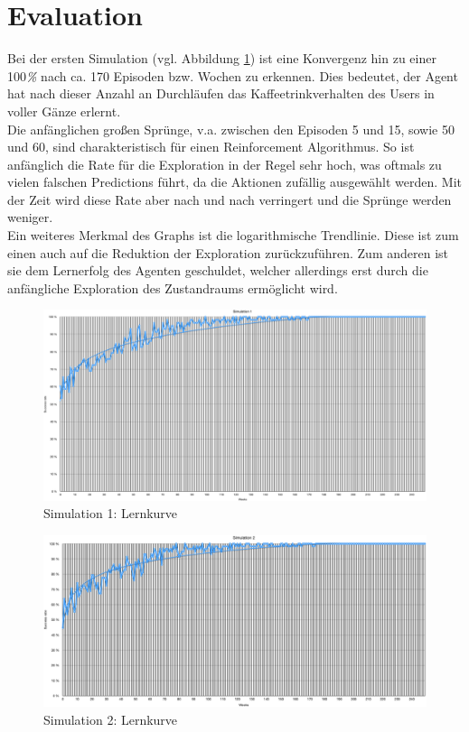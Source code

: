 \newpage
\section{Evaluation}

Bei der ersten Simulation (vgl. Abbildung \ref{img:sim1}) ist eine Konvergenz hin zu einer 100\textit{\%}  nach ca. 170 Episoden bzw. Wochen zu erkennen. Dies bedeutet, der Agent hat nach dieser Anzahl an Durchläufen das Kaffeetrinkverhalten des Users in voller Gänze erlernt. \\
Die anfänglichen großen Sprünge, v.a. zwischen den Episoden 5 und 15, sowie 50 und 60, sind charakteristisch für einen Reinforcement Algorithmus. So ist anfänglich die Rate für die Exploration in der Regel sehr hoch, was oftmals zu vielen falschen Predictions führt, da die Aktionen zufällig ausgewählt werden. Mit der Zeit wird diese Rate aber nach und nach verringert und die Sprünge werden weniger. \\
Ein weiteres Merkmal des Graphs ist die logarithmische Trendlinie. Diese ist zum einen auch auf die Reduktion der Exploration zurückzuführen. Zum anderen ist sie dem Lernerfolg des Agenten geschuldet, welcher allerdings erst durch die anfängliche Exploration des Zustandraums ermöglicht wird.


\begin{figure}[th!]
	\centering
	\includegraphics[width=.9\columnwidth]{./Abbildungen/Kapitel_04/sim1.png}
	\caption{Simulation 1: Lernkurve}
	\label{img:sim1}
\end{figure}


\begin{figure}[th!]
	\centering
	\includegraphics[width=.9\columnwidth]{./Abbildungen/Kapitel_04/sim2.png}
	\caption{Simulation 2: Lernkurve}
	\label{img:sim2}
\end{figure}



